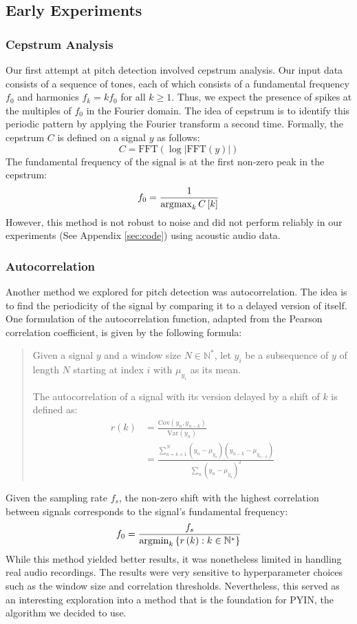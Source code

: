 \subsection{Early Experiments}
\label{sec:experiments}

\subsubsection{Cepstrum Analysis}

Our first attempt at pitch detection involved cepstrum analysis. Our input data consists of a sequence of tones, each of which consists of a fundamental frequency $f_0$ and harmonics $f_k = k f_0$ for all $k \geq 1$. Thus, we expect the presence of spikes at the multiples of $f_0$ in the Fourier domain. The idea of cepstrum is to identify this periodic pattern by applying the Fourier transform a second time. Formally, the cepstrum $C$ is defined on a signal $y$ as follows:
$$C = \text{FFT}\left(\log\left|\text{FFT}\left(y\right)\right|\right)$$
The fundamental frequency of the signal is at the first non-zero peak in the cepstrum:
$$f_0 = \frac{1}{\operatorname*{\arg\!\max}_{k} C\left[k\right]}$$
However, this method is not robust to noise and did not perform reliably in our experiments (See Appendix \ref{sec:code}) using acoustic audio data.

\subsubsection{Autocorrelation}

Another method we explored for pitch detection was autocorrelation. The idea is to find the periodicity of the signal by comparing it to a delayed version of itself. One formulation of the autocorrelation function, adapted from the Pearson correlation coefficient, is given by the following formula:
\begin{quote}
    Given a signal $y$ and a window size $N \in \mathbb N^\ast$, let $y_i$ be a subsequence of $y$ of length $N$ starting at index $i$ with $\mu_{y_i}$ as its mean.

    The autocorrelation of a signal with its version delayed by a shift of $k$ is defined as:
    \begin{align*}
        r\left(k\right)
        &= \frac{\text{Cov}\left(y_n, y_{n-k}\right)}{\text{Var}\left(y_n\right)} \\
        &= \frac{\sum_{n=k+1}^N \left(y_n - \mu_{y_n}\right) \left(y_{n-k} - \mu_{y_{n-k}}\right)}{\sum_n \left(y_n - \mu_{y_n}\right)^2}
    \end{align*}
\end{quote}
Given the sampling rate $f_s$, the non-zero shift with the highest correlation between signals corresponds to the signal's fundamental frequency:
$$f_0 = \frac{f_s}{\operatorname*{\arg\!\min}_{k}\left\{ r\left(k\right) : k \in \mathbb N^\ast \right\}}$$
While this method yielded better results, it was nonetheless limited in handling real audio recordings. The results were very sensitive to hyperparameter choices such as the window size and correlation thresholds. Nevertheless, this served as an interesting exploration into a method that is the foundation for PYIN, the algorithm we decided to use.


